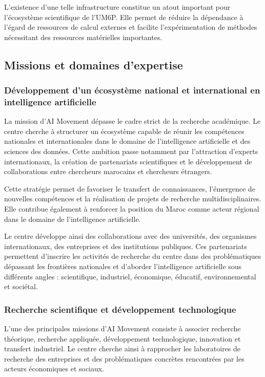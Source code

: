 \documentclass[12pt,a4paper]{report}
\begin{document}
L'existence d'une telle infrastructure constitue un atout important pour l'écosystème scientifique de l'UM6P. Elle permet de réduire la dépendance à l'égard de ressources de calcul externes et facilite l'expérimentation de méthodes nécessitant des ressources matérielles importantes.

\subsection{Missions et domaines d'expertise}

\subsubsection{Développement d'un écosystème national et international en intelligence artificielle}

La mission d'AI Movement dépasse le cadre strict de la recherche académique. Le centre cherche à structurer un écosystème capable de réunir les compétences nationales et internationales dans le domaine de l'intelligence artificielle et des sciences des données. Cette ambition passe notamment par l'attraction d'experts internationaux, la création de partenariats scientifiques et le développement de collaborations entre chercheurs marocains et chercheurs étrangers.

Cette stratégie permet de favoriser le transfert de connaissances, l'émergence de nouvelles compétences et la réalisation de projets de recherche multidisciplinaires. Elle contribue également à renforcer la position du Maroc comme acteur régional dans le domaine de l'intelligence artificielle.

Le centre développe ainsi des collaborations avec des universités, des organismes internationaux, des entreprises et des institutions publiques. Ces partenariats permettent d'inscrire les activités de recherche du centre dans des problématiques dépassant les frontières nationales et d'aborder l'intelligence artificielle sous différents angles : scientifique, industriel, économique, éducatif, environnemental et sociétal.

\subsubsection{Recherche scientifique et développement technologique}

L'une des principales missions d'AI Movement consiste à associer recherche théorique, recherche appliquée, développement technologique, innovation et transfert industriel. Le centre cherche ainsi à rapprocher les laboratoires de recherche des entreprises et des problématiques concrètes rencontrées par les acteurs économiques et sociaux.
\end{document}
